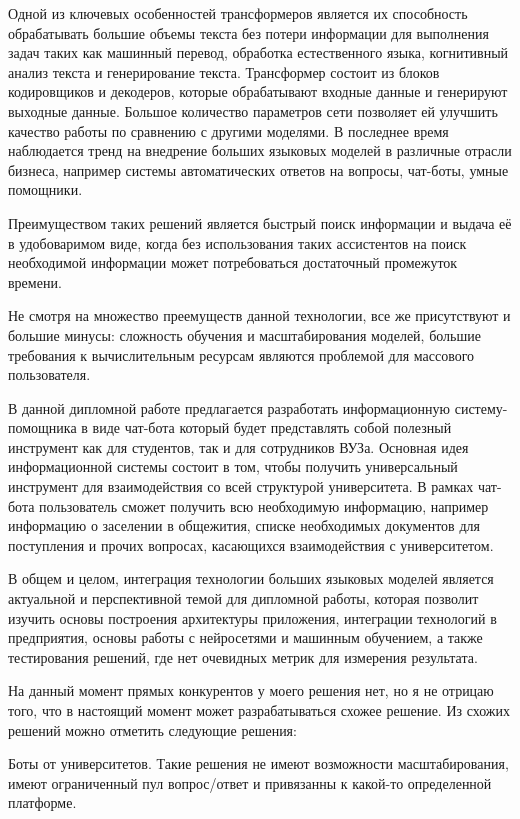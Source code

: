 Одной из ключевых особенностей трансформеров является их способность 
обрабатывать большие объемы текста без потери информации для выполнения задач
таких как машинный перевод, обработка естественного языка, когнитивный анализ
текста и генерирование текста. Трансформер состоит из блоков кодировщиков и
декодеров, которые обрабатывают входные данные и генерируют выходные данные.
Большое количество параметров сети позволяет ей улучшить качество работы по 
сравнению с другими моделями. В последнее время наблюдается тренд
на внедрение больших языковых моделей в различные отрасли бизнеса, например
системы автоматических ответов на вопросы, чат-боты, умные помощники. 

Преимуществом таких решений является быстрый поиск информации и выдача её в
удобоваримом виде, когда без использования таких ассистентов на поиск
необходимой информации может потребоваться достаточный промежуток времени.

Не смотря на множество преемуществ данной технологии, все же присутствуют и
большие минусы: сложность обучения и масштабирования моделей, большие требования
к вычислительным ресурсам являются проблемой для массового пользователя.

В данной дипломной работе предлагается разработать информационную 
систему-помощника в виде чат-бота который будет представлять собой полезный
инструмент как для студентов, так и для сотрудников ВУЗа. Основная идея
информационной системы состоит в том, чтобы получить универсальный инструмент
для взаимодействия со всей структурой университета. В рамках чат-бота 
пользователь сможет получить всю необходимую информацию, например информацию о
заселении в общежития, списке необходимых документов для поступления и прочих
вопросах, касающихся взаимодействия с университетом.

В общем и целом, интеграция технологии больших языковых моделей является
актуальной и перспективной темой для дипломной работы, которая позволит изучить
основы построения архитектуры приложения, интеграции технологий в предприятия,
основы работы с нейросетями и машинным обучением, а также тестирования решений,
где нет очевидных метрик для измерения результата.


На данный момент прямых конкурентов у моего решения нет, но я не отрицаю того,
что в настоящий момент может разрабатываться схожее решение. Из схожих решений
можно отметить следующие решения:

Боты от университетов. Такие решения не имеют возможности масштабирования,
имеют ограниченный пул вопрос/ответ и привязанны к какой-то определенной
платформе.


